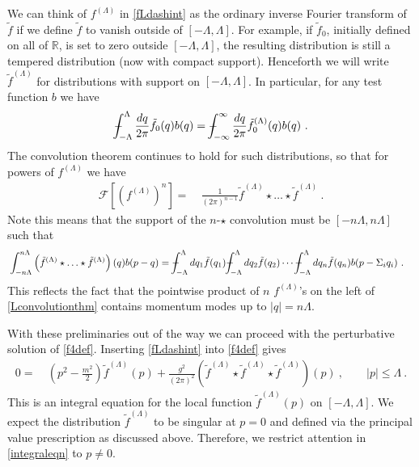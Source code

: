 \def\letter{0}\def\pr{0}\documentclass[a4paper,12pt, epsfig]{article}
\def\Xint#1{\mathchoice
   {\XXint\displaystyle\textstyle{#1}}%
   {\XXint\textstyle\scriptstyle{#1}}%
   {\XXint\scriptstyle\scriptscriptstyle{#1}}%
   {\XXint\scriptscriptstyle\scriptscriptstyle{#1}}%
   \!\int}
\def\XXint#1#2#3{{\setbox0=\hbox{$#1{#2#3}{\int}$}
     \vcenter{\hbox{$#2#3$}}\kern-.5\wd0}}
\def\dashint{\Xint-}
\renewcommand{\(}{\begin{equation}}
\renewcommand{\)}{end{equation} \vspace{-.05in}\linebreak}
\renewcommand{\=}{\hspace{-.03in}=\hspace{-.02in}}
\renewcommand{\(}{\begin{equation}}
\renewcommand{\)}{\end{equation}}
\renewcommand{\(}{\begin{equation}}
\renewcommand{\)}{\end{equation}}
\begin{document}
We can think of $f^{(\Lambda)}$ in \eqref{fLdashint} as the ordinary inverse Fourier transform of $\tilde{f}$ if we define $\tilde{f}$ to vanish outside of $[-\Lambda,\Lambda]$.  For example, if $\tilde{f}_0$, initially defined on all of $\mathbb{R}$, is set to zero outside $[-\Lambda,\Lambda]$, the resulting distribution is still a tempered distribution (now with compact support).  Henceforth we will write $\tilde{f}^{(\Lambda)}$ for distributions with support on $[-\Lambda,\Lambda]$.  In particular, for any test function $b$ we have
%
\begin{equation}
\dashint_{-\Lambda}^{\Lambda} \frac{dq}{2\pi} \tilde{f}_0(q) b(q) = \dashint_{-\infty}^{\infty} \frac{dq}{2\pi} \tilde{f}_{0}^{(\Lambda)}(q) b(q)~.
\end{equation}
%
The convolution theorem continues to hold for such distributions, so that for powers of $f^{(\Lambda)}$ we have
%
\begin{align}\label{Lconvolutionthm}
\mathcal{F}[(f^{(\Lambda)})^n] =&~ \frac{1}{(2\pi)^{n-1}} \tilde{f}^{(\Lambda)} \star \ldots \star \tilde{f}^{(\Lambda)}~.
\end{align}
%
Note this means that the support of the $n$-$\star$ convolution must be $[-n\Lambda,n\Lambda]$ such that
%
\begin{align}
& \int_{-n \Lambda}^{n\Lambda} \left(\tilde{f}^{(\Lambda)} \star \ldots \star \tilde{f}^{(\Lambda)}\right)(q) b(p-q) =  \dashint_{-\Lambda}^{\Lambda} dq_1 \tilde{f}(q_1) \dashint_{-\Lambda}^{\Lambda} dq_2 \tilde{f}(q_2) \cdots \dashint_{-\Lambda}^{\Lambda} dq_n \tilde{f}(q_n) b(p - \Sigma_i q_i) ~. 
\end{align}
%
This reflects the fact that the pointwise product of $n$ $f^{(\Lambda)}$'s on the left of \eqref{Lconvolutionthm} contains momentum modes up to $|q| = n \Lambda$.

With these preliminaries out of the way we can proceed with the perturbative solution of \eqref{f4def}.  Inserting \eqref{fLdashint} into \eqref{f4def} gives 
%
\begin{align}\label{integraleqn}
0 =&~ \left( p^2 - \frac{m^2}{2} \right) \tilde{f}^{(\Lambda)}(p) + \frac{g^2}{(2\pi)^2} \left(\tilde{f}^{(\Lambda)} \star \tilde{f}^{(\Lambda)} \star \tilde{f}^{(\Lambda)}\right)(p) ~, \qquad |p| \leq \Lambda~.
\end{align}
%
This is an integral equation for the local function $\tilde{f}^{(\Lambda)}(p)$ on $[-\Lambda,\Lambda]$.  We expect the distribution $\tilde{f}^{(\Lambda)}$ to be singular at $p = 0$ and defined via the principal value prescription as discussed above.  Therefore, we restrict attention in \eqref{integraleqn} to $p \neq 0$.
\end{document}
